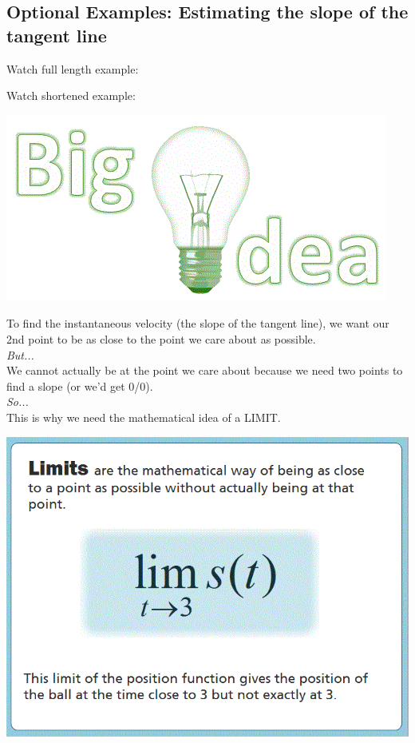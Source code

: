 \documentclass{ximera}
\begin{document}
\subsection{Optional Examples: Estimating the slope of the tangent line}

Watch full length example:
\begin{foldable}
\end{foldable}

Watch shortened example: 
\begin{foldable}
\end{foldable}

\begin{image}
\includegraphics{bigidea.gif}
\end{image}
To find the instantaneous velocity (the slope of the tangent line), we want our 2nd point to be as close to the point we care about as possible. \\
\textit{But...} \\
We cannot actually be at the point we care about because we need two points to find a slope (or we'd get 0/0). \\
\textit{So...} \\
This is why we need the mathematical idea of a LIMIT.

\begin{image}
\includegraphics{picture7.gif}
\end{image}

\end{document}
